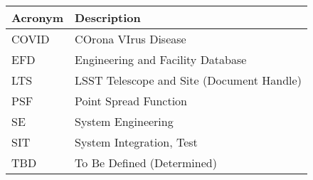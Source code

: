 \addtocounter{table}{-1}
\begin{longtable}{p{}p{}}\hline
\textbf{Acronym} & \textbf{Description}  \\\hline

COVID & COrona VIrus Disease \\\hline
EFD & Engineering and Facility Database \\\hline
LTS & LSST Telescope and Site  (Document Handle) \\\hline
PSF & Point Spread Function \\\hline
SE & System Engineering \\\hline
SIT & System Integration, Test \\\hline
TBD & To Be Defined (Determined) \\\hline
\end{longtable}
